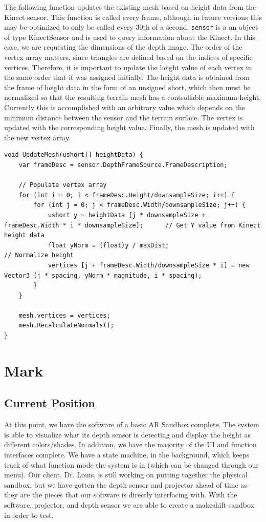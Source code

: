 \documentclass[onecolumn, draftclsnofoot,10pt, compsoc]{IEEEtran}
\begin{document}
The following function updates the existing mesh based on height data from the Kinect sensor. This function is called every frame, although in future versions this may be optimized to only be called every 30th of a second. \texttt{sensor} is a an object of type KinectSensor and is used to query information about the Kinect. In this case, we are requesting the dimensions of the depth image. The order of the vertex array matters, since triangles are defined based on the indices of specific vertices. Therefore, it is important to update the height value of each vertex in the same order that it was assigned initially. The height data is obtained from the frame of height data in the form of an unsigned short, which then must be normalized so that the resulting terrain mesh has a controllable maximum height. Currently this is accomplished with an arbitrary value which depends on the minimum distance between the sensor and the terrain surface. The vertex is updated with the corresponding height value. Finally, the mesh is updated with the new vertex array.

\begin{lstlisting}
void UpdateMesh(ushort[] heightData) {
	var frameDesc = sensor.DepthFrameSource.FrameDescription;

	// Populate vertex array
	for (int i = 0; i < frameDesc.Height/downsampleSize; i++) {
		for (int j = 0; j < frameDesc.Width/downsampleSize; j++) {
			ushort y = heightData [j * downsampleSize + frameDesc.Width * i * downsampleSize];		// Get Y value from Kinect height data
			float yNorm = (float)y / maxDist; 														// Normalize height	
			vertices [j + frameDesc.Width/downsampleSize * i] = new Vector3 (j * spacing, yNorm * magnitude, i * spacing);
		}
	}

	mesh.vertices = vertices;
	mesh.RecalculateNormals();
}
\end{lstlisting}

\section{Mark}
\subsection{Current Position} 
At this point, we have the software of a basic AR Sandbox complete.  The system is able to visualize what its depth sensor is detecting and display the height as different colors/shades.  In addition, we have the majority of the UI and function interfaces complete.  We have a state machine, in the background, which keeps track of what function mode the system is in (which can be changed through our menu).
Our client, Dr. Louis, is still working on putting together the physical sandbox, but we have gotten the depth sensor and projector ahead of time as they are the pieces that our software is directly interfacing with.  With the software, projector, and depth sensor we are able to create a makeshift sandbox in order to test.
\end{document}
